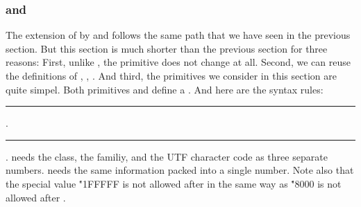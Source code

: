 \subsubsection{ and }
The extension of  by  and  follows the
same path that we have seen in the previous section.
But this section is much shorter than the previous section for three reasons:
First, unlike , the primitive   does not change at all.
Second, we can reuse the definitions of  , , .
And third, the primitives we consider in this section are quite simpel.
Both primitives  and  define a .
And here are the syntax rules:
\medskip
\rule{}:  .
\rule{}:    .
\medskip
\noindent {} needs the class, the familiy, and the UTF character code as three separate
numbers.  needs the same information packed into a single number.
Note also that the special  value \.{"1FFFFF} is not allowed after 
in the same way as \.{"8000} is not allowed after .

